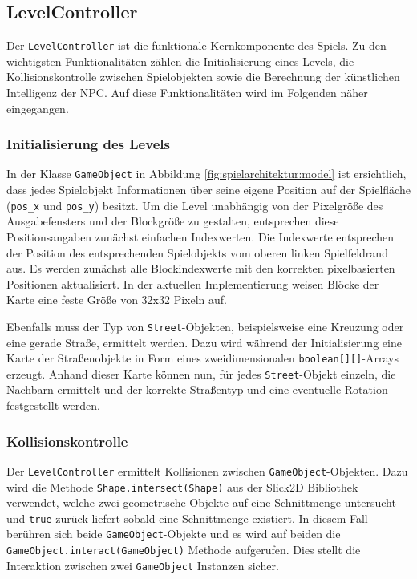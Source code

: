 \subsection{LevelController}
\label{sub:architektur:levelcontroller}

Der \texttt{LevelController} ist die funktionale Kernkomponente des Spiels.
Zu den wichtigsten Funktionalitäten zählen die Initialisierung eines Levels, die Kollisionskontrolle zwischen Spielobjekten sowie die Berechnung der künstlichen Intelligenz der NPC.
Auf diese Funktionalitäten wird im Folgenden näher eingegangen.

\subsubsection{Initialisierung des Levels}
In der Klasse \texttt{GameObject} in Abbildung \ref{fig:spielarchitektur:model} ist ersichtlich, dass jedes Spielobjekt Informationen über seine eigene Position auf der Spielfläche (\texttt{pos\_x} und \texttt{pos\_y}) besitzt.
Um die Level unabhängig von der Pixelgröße des Ausgabefensters und der Blockgröße zu gestalten, entsprechen diese Positionsangaben zunächst einfachen Indexwerten.
Die Indexwerte entsprechen der Position des entsprechenden Spielobjekts vom oberen linken Spielfeldrand aus.
Es werden zunächst alle Blockindexwerte mit den korrekten pixelbasierten Positionen aktualisiert.
In der aktuellen Implementierung weisen Blöcke der Karte eine feste Größe von 32x32 Pixeln auf.

Ebenfalls muss der Typ von \texttt{Street}-Objekten, beispielsweise eine Kreuzung oder eine gerade Straße, ermittelt werden.
Dazu wird während der Initialisierung eine Karte der Straßenobjekte in Form eines zweidimensionalen \texttt{boolean[][]}-Arrays erzeugt.
Anhand dieser Karte können nun, für jedes \texttt{Street}-Objekt einzeln, die Nachbarn ermittelt und der korrekte Straßentyp und eine eventuelle Rotation festgestellt werden.

\subsubsection{Kollisionskontrolle}
Der \texttt{LevelController} ermittelt Kollisionen zwischen \texttt{GameObject}-Objekten.
Dazu wird die Methode \texttt{Shape.intersect(Shape)} aus der Slick2D Bibliothek verwendet, welche zwei geometrische Objekte auf eine Schnittmenge untersucht und \texttt{true} zurück liefert sobald eine Schnittmenge existiert.
In diesem Fall berühren sich beide \texttt{GameObject}-Objekte und es wird auf beiden die \texttt{GameObject.interact(GameObject)} Methode aufgerufen.
Dies stellt die Interaktion zwischen zwei \texttt{GameObject} Instanzen sicher.

